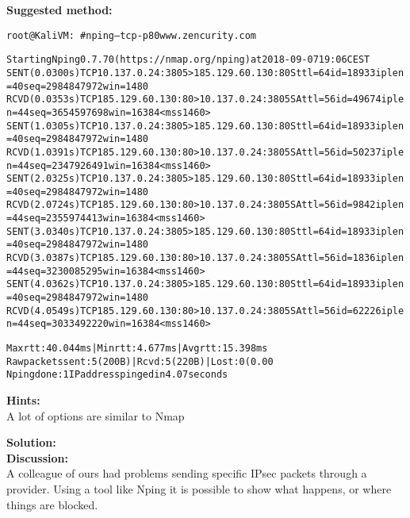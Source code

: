 \documentclass[a4paper,11pt,notitlepage]{report}
\begin{document}
{\bf Suggested method:}\\
\begin{alltt}\footnotesize
  root@KaliVM:~# nping --tcp -p 80 www.zencurity.com

  Starting Nping 0.7.70 ( https://nmap.org/nping ) at 2018-09-07 19:06 CEST
  SENT (0.0300s) TCP 10.137.0.24:3805 > 185.129.60.130:80 S ttl=64 id=18933 iplen=40  seq=2984847972 win=1480
  RCVD (0.0353s) TCP 185.129.60.130:80 > 10.137.0.24:3805 SA ttl=56 id=49674 iplen=44  seq=3654597698 win=16384 <mss 1460>
  SENT (1.0305s) TCP 10.137.0.24:3805 > 185.129.60.130:80 S ttl=64 id=18933 iplen=40  seq=2984847972 win=1480
  RCVD (1.0391s) TCP 185.129.60.130:80 > 10.137.0.24:3805 SA ttl=56 id=50237 iplen=44  seq=2347926491 win=16384 <mss 1460>
  SENT (2.0325s) TCP 10.137.0.24:3805 > 185.129.60.130:80 S ttl=64 id=18933 iplen=40  seq=2984847972 win=1480
  RCVD (2.0724s) TCP 185.129.60.130:80 > 10.137.0.24:3805 SA ttl=56 id=9842 iplen=44  seq=2355974413 win=16384 <mss 1460>
  SENT (3.0340s) TCP 10.137.0.24:3805 > 185.129.60.130:80 S ttl=64 id=18933 iplen=40  seq=2984847972 win=1480
  RCVD (3.0387s) TCP 185.129.60.130:80 > 10.137.0.24:3805 SA ttl=56 id=1836 iplen=44  seq=3230085295 win=16384 <mss 1460>
  SENT (4.0362s) TCP 10.137.0.24:3805 > 185.129.60.130:80 S ttl=64 id=18933 iplen=40  seq=2984847972 win=1480
  RCVD (4.0549s) TCP 185.129.60.130:80 > 10.137.0.24:3805 SA ttl=56 id=62226 iplen=44  seq=3033492220 win=16384 <mss 1460>

  Max rtt: 40.044ms | Min rtt: 4.677ms | Avg rtt: 15.398ms
  Raw packets sent: 5 (200B) | Rcvd: 5 (220B) | Lost: 0 (0.00%)
  Nping done: 1 IP address pinged in 4.07 seconds
\end{alltt}

{\bf Hints:} \\
A lot of options are similar to Nmap

{\bf Solution:}\\


{\bf Discussion:}\\
A colleague of ours had problems sending specific IPsec packets through a provider. Using a tool like Nping it is possible to show what happens, or where things are blocked.
\end{document}
